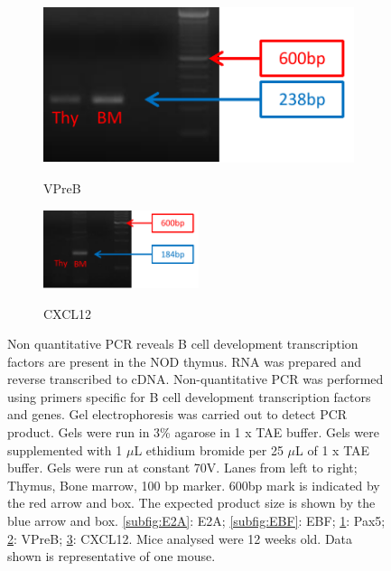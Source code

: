 \begin{figure}
\begin{subfigure}{0.5\textwidth}
	\label{subfig:Pax5}
	\end{subfigure}
	\begin{subfigure}{0.5\textwidth}
	\centering
	\caption{VPreB}
	\includegraphics[width=\textwidth]{Figures/VPreB.pdf}
	\label{subfig:VPreB}
	\end{subfigure}
	\begin{subfigure}{\textwidth}
	\caption{CXCL12}
	\includegraphics[width=0.5\textwidth]{Figures/CXCL12.pdf}
	\label{subfig:CXCL12}
	\end{subfigure}
\caption[Non quantitative PCR reveals B cell development transcription factors are present in the NOD thymus]{Non quantitative PCR reveals B cell development transcription factors are present in the NOD thymus.
RNA was prepared and reverse transcribed to cDNA.
Non-quantitative PCR was performed using primers specific for B cell development transcription factors and genes.
Gel electrophoresis was carried out to detect PCR product.
Gels were run in 3\% agarose in 1 x TAE buffer. Gels were supplemented with 1 $\mu$L ethidium bromide per 25 $\mu$L of 1 x TAE buffer. Gels were run at constant 70V.
Lanes from left to right; Thymus, Bone marrow, 100 bp marker. 
600bp mark is indicated by the red arrow and box.
The expected product size is shown by the blue arrow and box.
\ref{subfig:E2A}: E2A; \ref{subfig:EBF}: EBF; \ref{subfig:Pax5}: Pax5; \ref{subfig:VPreB}: VPreB; \ref{subfig:CXCL12}: CXCL12.
Mice analysed were 12 weeks old.
Data shown is representative of one mouse.}
\label{fig:gels}
\end{figure}


